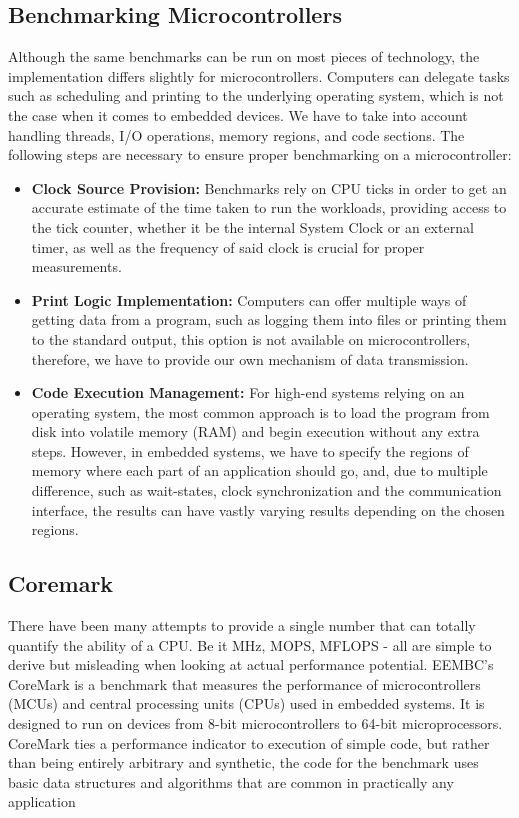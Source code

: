 \subsection{Benchmarking Microcontrollers}
Although the same benchmarks can be run on most pieces of technology, the implementation differs slightly for microcontrollers. Computers can delegate tasks such as scheduling and printing to the underlying operating system, which is not the case when it comes to embedded devices. We have to take into account handling threads, I/O operations, memory regions, and code sections.
The following steps are necessary to ensure proper benchmarking on a microcontroller:
\begin{itemize}
    \item \textbf{Clock Source Provision:} Benchmarks rely on CPU ticks in order to get an accurate estimate of the time taken to run the workloads, providing access to the tick counter, whether it be the internal System Clock or an external timer, as well as the frequency of said clock is crucial for proper measurements.
    \item \textbf{Print Logic Implementation:} Computers can offer multiple ways of getting data from a program, such as logging them into files or printing them to the standard output, this option is not available on microcontrollers, therefore, we have to provide our own mechanism of data transmission.
    \item \textbf{Code Execution Management:} For high-end systems relying on an operating system, the most common approach is to load the program from disk into volatile memory (RAM) and begin execution without any extra steps. However, in embedded systems, we have to specify the regions of memory where each part of an application should go, and, due to multiple difference, such as wait-states, clock synchronization and the communication interface, the results can have vastly varying results depending on the chosen regions.
\end{itemize}
\subsection{Coremark}
There have been many attempts to provide a single number that can totally quantify the
ability of a CPU. Be it MHz, MOPS, MFLOPS - all are simple to derive but misleading
when looking at actual performance potential.
EEMBC’s CoreMark is a benchmark that measures the performance of microcontrollers (MCUs) and central processing units (CPUs) used in embedded systems.
It is designed to run on devices from 8-bit microcontrollers to 64-bit microprocessors.
CoreMark ties a performance indicator to execution of simple
code, but rather than being entirely arbitrary and synthetic, the code for the benchmark
uses basic data structures and algorithms that are common in practically any application
